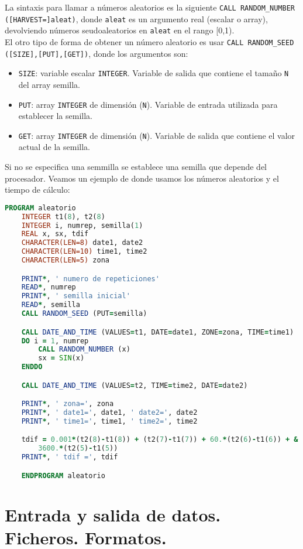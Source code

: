 La sintaxis para llamar a números aleatorios es la siguiente {\tt CALL RANDOM\_NUMBER ([HARVEST=]aleat)}, donde {\tt aleat} es un argumento real (escalar o array), devolviendo números seudoaleatorios en {\tt aleat} en el rango [0,1). \\

El otro tipo de forma de obtener un número aleatorio es usar {\tt CALL RANDOM\_SEED ([SIZE],[PUT],[GET])}, donde los argumentos son:

\begin{itemize}
	\item {\tt SIZE}: variable escalar {\tt INTEGER}. Variable de salida que contiene el tamaño {\tt N} del array semilla.
	\item {\tt PUT}: array {\tt INTEGER} de dimensión ({\tt N}). Variable de entrada utilizada para establecer la semilla.
	\item {\tt GET}: array {\tt INTEGER} de dimensión ({\tt N}). Variable de salida que contiene el valor actual de la semilla.
\end{itemize}
Si no se especifica una semmilla se establece una semilla que depende del procesador. Veamos un ejemplo de donde usamos los números aleatorios y el tiempo de cálculo:

\begin{lstlisting}[language=Fortran]
	PROGRAM aleatorio 
	INTEGER t1(8), t2(8)
	INTEGER i, numrep, semilla(1)
	REAL x, sx, tdif
	CHARACTER(LEN=8) date1, date2
	CHARACTER(LEN=10) time1, time2
	CHARACTER(LEN=5) zona

	PRINT*, ' numero de repeticiones'
	READ*, numrep
	PRINT*, ' semilla inicial'
	READ*, semilla
	CALL RANDOM_SEED (PUT=semilla)

	CALL DATE_AND_TIME (VALUES=t1, DATE=date1, ZONE=zona, TIME=time1)
	DO i = 1, numrep
		CALL RANDOM_NUMBER (x)
		sx = SIN(x)
	ENDDO

	CALL DATE_AND_TIME (VALUES=t2, TIME=time2, DATE=date2)

	PRINT*, ' zona=', zona
	PRINT*, ' date1=', date1, ' date2=', date2
	PRINT*, ' time1=', time1, ' time2=', time2

	tdif = 0.001*(t2(8)-t1(8)) + (t2(7)-t1(7)) + 60.*(t2(6)-t1(6)) + &
		3600.*(t2(5)-t1(5))
	PRINT*, ' tdif =', tdif

	ENDPROGRAM aleatorio
\end{lstlisting}



\section{Entrada y salida de datos. Ficheros. Formatos.}


